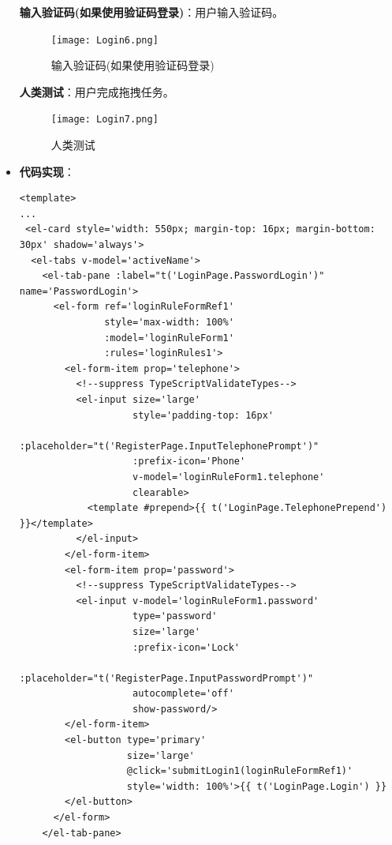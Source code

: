 \begin{itemize}
	\textbf{输入验证码(如果使用验证码登录)}：用户输入验证码。

	\begin{figure}[H]
		\centering
		\texttt{[image: Login6.png]}
		\caption{输入验证码(如果使用验证码登录)}
	\end{figure}

	\textbf{人类测试}：用户完成拖拽任务。

	\begin{figure}[H]
		\centering
		\texttt{[image: Login7.png]}
		\caption{人类测试}
	\end{figure}

	\item \textbf{代码实现}：
	\begin{verbatim}
<template>
...
 <el-card style='width: 550px; margin-top: 16px; margin-bottom: 30px' shadow='always'>
  <el-tabs v-model='activeName'>
    <el-tab-pane :label="t('LoginPage.PasswordLogin')" name='PasswordLogin'>
      <el-form ref='loginRuleFormRef1'
               style='max-width: 100%'
               :model='loginRuleForm1'
               :rules='loginRules1'>
        <el-form-item prop='telephone'>
          <!--suppress TypeScriptValidateTypes-->
          <el-input size='large'
                    style='padding-top: 16px'
                    :placeholder="t('RegisterPage.InputTelephonePrompt')"
                    :prefix-icon='Phone'
                    v-model='loginRuleForm1.telephone'
                    clearable>
            <template #prepend>{{ t('LoginPage.TelephonePrepend') }}</template>
          </el-input>
        </el-form-item>
        <el-form-item prop='password'>
          <!--suppress TypeScriptValidateTypes-->
          <el-input v-model='loginRuleForm1.password'
                    type='password'
                    size='large'
                    :prefix-icon='Lock'
                    :placeholder="t('RegisterPage.InputPasswordPrompt')"
                    autocomplete='off'
                    show-password/>
        </el-form-item>
        <el-button type='primary'
                   size='large'
                   @click='submitLogin1(loginRuleFormRef1)'
                   style='width: 100%'>{{ t('LoginPage.Login') }}
        </el-button>
      </el-form>
    </el-tab-pane>
	

\end{verbatim}
\end{itemize}
